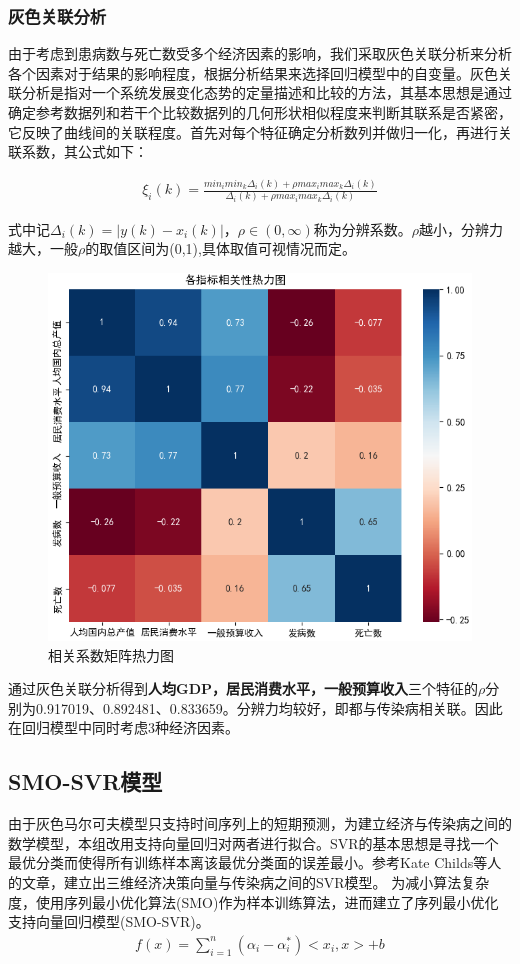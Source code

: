 \documentclass{whutmod}
\begin{document}
     	\subsubsection{灰色关联分析}
     由于考虑到患病数与死亡数受多个经济因素的影响，我们采取灰色关联分析来分析各个因素对于结果的影响程度，根据分析结果来选择回归模型中的自变量。灰色关联分析是指对一个系统发展变化态势的定量描述和比较的方法，其基本思想是通过确定参考数据列和若干个比较数据列的几何形状相似程度来判断其联系是否紧密，它反映了曲线间的关联程度。首先对每个特征确定分析数列并做归一化，再进行关联系数，其公式如下：
     
     \begin{gather}
     \xi _{i}\left ( k \right )=\frac{min_{i} min_{k}\Delta _{i}(k)+\rho max_{i} max_{k}\Delta _{i}(k)}{\Delta _{i}(k)+\rho max_{i} max_{k}\Delta _{i}(k)}
     \end{gather}
     
     
     式中记$\Delta _{i}(k)=|y(k)-x_{i}(k)|$，$\rho \in (0,\infty )$称为分辨系数。$\rho $越小，分辨力越大，一般$\rho $的取值区间为(0,1),具体取值可视情况而定。
 \begin{figure}[H]
 	\centering
 	\includegraphics[width=.7\textwidth]{figures/Figure_8.png}
 	\caption{相关系数矩阵热力图}\label{re}
 \end{figure}
     	
     	通过灰色关联分析得到\textbf{人均GDP，居民消费水平，一般预算收入}三个特征的$\rho $分别为0.917019、0.892481、0.833659。分辨力均较好，即都与传染病相关联。因此在回归模型中同时考虑3种经济因素。

     
     
     \subsection{SMO-SVR模型}   
     	由于灰色马尔可夫模型只支持时间序列上的短期预测，为建立经济与传染病之间的数学模型，本组改用支持向量回归对两者进行拟合。SVR的基本思想是寻找一个最优分类而使得所有训练样本离该最优分类面的误差最小。参考Kate Childs等人的文章\cite{bib:7}，建立出三维经济决策向量与传染病之间的SVR模型。
     为减小算法复杂度，使用序列最小优化算法(SMO)作为样本训练算法，进而建立了序列最小优化支持向量回归模型(SMO-SVR)。\cite{bib:8}
          \begin{gather}
     f(x)=\sum_{i=1}^{n}\left(\alpha_{i}-\alpha_{i}^{*}\right)<x_{i}, x>+b
     \end{gather}\label{svr}
     
\end{document}
